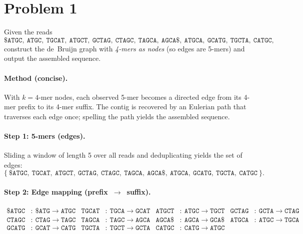 \section*{Problem 1}

Given the reads
\[
    \texttt{\$ATGC},\ \texttt{ATGC},\ \texttt{TGCAT},\ \texttt{ATGCT},\ \texttt{GCTAG},\ \texttt{CTAGC},\ \texttt{TAGCA},\ \texttt{AGCA\$},\ \texttt{ATGCA},\ \texttt{GCATG},\ \texttt{TGCTA},\ \texttt{CATGC},
\]
construct the de~Bruijn graph with \emph{4-mers as nodes} (so edges are 5-mers) and output the assembled sequence.

\paragraph{Method (concise).}
With \(k=4\)-mer nodes, each observed 5-mer becomes a directed edge from its 4-mer prefix to its 4-mer suffix. The contig is recovered by an Eulerian path that traverses each edge once; spelling the path yields the assembled sequence.

\paragraph{Step 1: 5-mers (edges).}
Sliding a window of length 5 over all reads and deduplicating yields the set of edges:
\[
    \{\ \texttt{\$ATGC},\ \texttt{TGCAT},\ \texttt{ATGCT},\ \texttt{GCTAG},\ \texttt{CTAGC},\ \texttt{TAGCA},\ \texttt{AGCA\$},\ \texttt{ATGCA},\ \texttt{GCATG},\ \texttt{TGCTA},\ \texttt{CATGC}\ \}.
\]

\paragraph{Step 2: Edge mapping (prefix~\(\to\)~suffix).}
\[
    \begin{aligned}
        \texttt{\$ATGC} & :~\texttt{\$ATG}\to\texttt{ATGC} &
        \texttt{TGCAT}  & :~\texttt{TGCA}\to\texttt{GCAT}  &
        \texttt{ATGCT}  & :~\texttt{ATGC}\to\texttt{TGCT}  &
        \texttt{GCTAG}  & :~\texttt{GCTA}\to\texttt{CTAG}        \\
        \texttt{CTAGC}  & :~\texttt{CTAG}\to\texttt{TAGC}  &
        \texttt{TAGCA}  & :~\texttt{TAGC}\to\texttt{AGCA}  &
        \texttt{AGCA\$} & :~\texttt{AGCA}\to\texttt{GCA\$} &
        \texttt{ATGCA}  & :~\texttt{ATGC}\to\texttt{TGCA}        \\
        \texttt{GCATG}  & :~\texttt{GCAT}\to\texttt{CATG}  &
        \texttt{TGCTA}  & :~\texttt{TGCT}\to\texttt{GCTA}  &
        \texttt{CATGC}  & :~\texttt{CATG}\to\texttt{ATGC}  &   &
    \end{aligned}
\]

